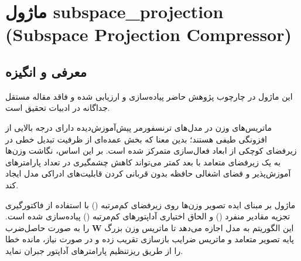 \section{ماژول subspace\_projection (Subspace Projection Compressor)}
\label{sec:module_subspace_projection}

\subsection{معرفی و انگیزه}
این ماژول در چارچوب پژوهش حاضر پیاده‌سازی و ارزیابی شده و فاقد مقاله مستقل جداگانه در ادبیات تحقیق است.

ماتریس‌های وزن در مدل‌های ترنسفورمر پیش‌آموزش‌دیده دارای درجه بالایی از افزونگی طیفی هستند؛ بدین معنا که بخش عمده‌ای از ظرفیت تبدیل خطی در زیرفضای کوچکی از ابعاد فعال‌سازی متمرکز شده است. بر این اساس، نگاشت وزن‌ها به یک زیرفضای متعامد با بعد کمتر می‌تواند کاهش چشمگیری در تعداد پارامترهای آموزش‌پذیر و فضای اشغالی حافظه بدون قربانی کردن قابلیت‌های ادراکی مدل ایجاد کند.

ماژول  بر مبنای ایده تصویر وزن‌ها روی زیرفضای کم‌مرتبه () با استفاده از فاکتورگیری تجزیه مقادیر منفرد () و الحاق اختیاری آداپتورهای کم‌مرتبه () پیاده‌سازی شده است. این الگوریتم به مدل اجازه می‌دهد تا ماتریس وزن بزرگ $\mathbf{W}$ را به صورت حاصل‌ضرب پایه تصویر متعامد و ماتریس ضرایب بازسازی تقریب زده و در صورت نیاز، مانده خطا را از طریق ریزتنظیم پارامترهای آداپتور جبران نماید.

